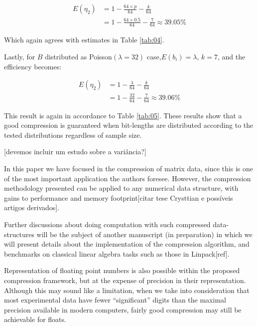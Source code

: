 \documentclass[10pt]{article}
\begin{document}
\begin{align}\label{eq:47}
 E(\eta_2) &= 1 - \frac{64 \times p }{64} - \frac{k}{64}  \\
  &= 1 - \frac{64 \times 0.5 }{64} - \frac{7}{64} \approx 39.05\% \nonumber
\end{align}

Which again agrees with estimates in Table \ref{tab:04}. 

Lastly, for $B$ distributed as Poisson$(\lambda=32)$ case,$E(b_i) = \lambda$, $k=7$, and the efficiency becomes:

\begin{align}\label{eq:49}
 E(\eta_2) &= 1 - \frac{\lambda}{64} - \frac{k}{64} \\
 &= 1 - \frac{32}{64} - \frac{7}{64} \approx 39.06\%
\end{align}

This result is again in accordance to Table \ref{tab:05}. These results show that a good compression is guaranteed when bit-lengths are distributed according to the tested distributions regardless of sample size.

[devemos incluir um estudo sobre a variância?]

In this paper we have focused in the compression of matrix data, since this is one of the most important application the authors foresee. However, the compression methodology presented can be applied to any numerical data structure, with gains to performance and memory footprint[citar tese Crysttian e possíveis artigos derivados]. 

Further discussions about doing computation with such compressed data-structures will be the subject of another manuscript (in preparation) in which we will present details about the implementation of the compression algorithm, and benchmarks on classical linear algebra tasks such as those in Linpack[ref].

Representation of floating point numbers is also possible within the proposed compression framework, but at the expense of precision in their representation. Although this may sound like a limitation, when we take into consideration that most experimental data have fewer ``significant'' digits than the maximal precision available in modern computers, fairly good compression may still be achievable for floats.

\end{document}
